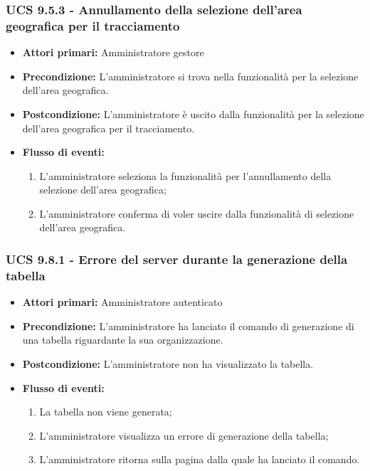 \subsubsection{UCS 9.5.3 - Annullamento della selezione dell'area geografica per il tracciamento}%
\begin{itemize}
\item \textbf{Attori primari:} Amministratore gestore
\item \textbf{Precondizione:} L'amministratore si trova nella funzionalità per la selezione dell'area geografica.
\item \textbf{Postcondizione:} L'amministratore è uscito dalla funzionalità per la selezione dell'area geografica per il tracciamento.
\item \textbf{Flusso di eventi:}
    \begin{enumerate}
    \item L'amministratore seleziona la funzionalità per l'annullamento della selezione dell'area geografica;
    \item L'amministratore conferma di voler uscire dalla funzionalità di selezione dell'area geografica.
    \end{enumerate} 
\end{itemize}

\subsubsection{UCS 9.8.1 - Errore del server durante la generazione della tabella}
\begin{itemize}
    \item \textbf{Attori primari:} Amministratore autenticato
    \item \textbf{Precondizione:} L'amministratore ha lanciato il comando di generazione di una tabella riguardante la sua organizzazione.
    \item \textbf{Postcondizione:} L'amministratore non ha visualizzato la tabella.
    \item \textbf{Flusso di eventi:} \begin{enumerate}
    \item La tabella non viene generata;
    \item L'amministratore visualizza un errore di generazione della tabella;
    \item L'amministratore ritorna sulla pagina dalla quale ha lanciato il comando.
    \end{enumerate}
\end{itemize}